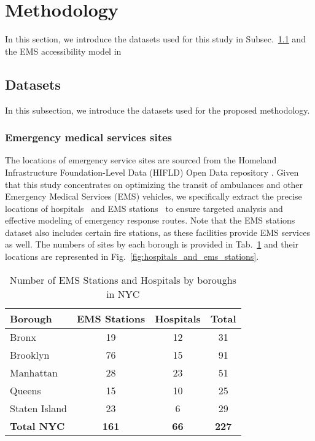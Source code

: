 \section{Methodology}
\label{sec:methodology}
In this section, we introduce the datasets used for this study in Subsec.~\ref{subsec:datasets} and the EMS accessibility model in 
\subsection{Datasets}\label{subsec:datasets}
In this subsection, we introduce the datasets used for the proposed methodology.
\subsubsection{Emergency medical services sites}
The locations of emergency service sites are sourced from the Homeland Infrastructure Foundation-Level Data (HIFLD) Open Data repository \cite{yan2023localized,li2023marganvac}. Given that this study concentrates on optimizing the transit of ambulances and other Emergency Medical Services (EMS) vehicles, we specifically extract the precise locations of hospitals~\cite{HIFLD_hospital} and EMS stations~\cite{HIFLD_EMS_Stations} to ensure targeted analysis and effective modeling of emergency response routes. Note that the EMS stations dataset also includes certain fire stations, as these facilities provide EMS services as well. The numbers of sites by each borough is provided in Tab.~\ref{table:hospitals_and_ems_stations} and their locations are represented in Fig.~\ref{fig:hospitals_and_ems_stations}.
\begin{table}[ht]
\centering
\begin{tabular}{@{}lccc@{}}
\toprule
\textbf{Borough} & \textbf{EMS Stations} & \textbf{Hospitals} & \textbf{Total} \\ \midrule
Bronx            & 19                    & 12                 & 31             \\
Brooklyn         & 76                    & 15                 & 91             \\
Manhattan        & 28                    & 23                 & 51             \\
Queens           & 15                    & 10                 & 25             \\
Staten Island    & 23                    & 6                 & 29             \\ \midrule
\textbf{Total NYC} & \textbf{161}        & \textbf{66}       & \textbf{227}   \\ \bottomrule
\end{tabular}
\caption{Number of EMS Stations and Hospitals by boroughs in NYC}
\label{table:hospitals_and_ems_stations}
\end{table}


